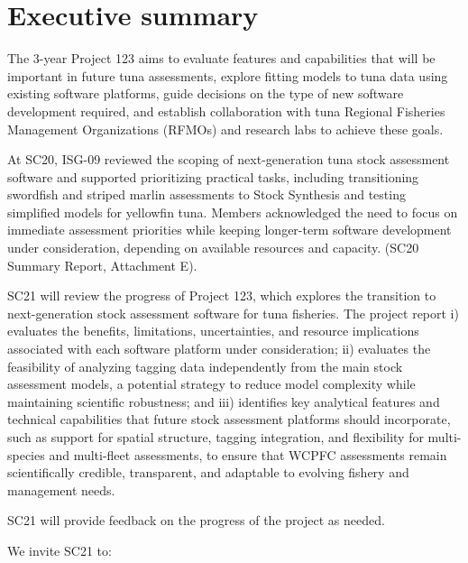 \documentclass{SCreport}
\begin{document}
\wcpfctitlepage

\tableofcontents
\newpage

\section{Executive summary}

The 3-year Project 123 aims to evaluate features and capabilities that will be
important in future tuna assessments, explore fitting models to tuna data using
existing software platforms, guide decisions on the type of new software
development required, and establish collaboration with tuna Regional Fisheries
Management Organizations (RFMOs) and research labs to achieve these goals.

At SC20, ISG-09 reviewed the scoping of next-generation tuna stock assessment
software and supported prioritizing practical tasks, including transitioning
swordfish and striped marlin assessments to Stock Synthesis and testing
simplified models for yellowfin tuna. Members acknowledged the need to focus on
immediate assessment priorities while keeping longer-term software development
under consideration, depending on available resources and capacity. (SC20
Summary Report, Attachment E).

SC21 will review the progress of Project 123, which explores the transition to
next-generation stock assessment software for tuna fisheries. The project report
i) evaluates the benefits, limitations, uncertainties, and resource implications
associated with each software platform under consideration; ii) evaluates the
feasibility of analyzing tagging data independently from the main stock
assessment models, a potential strategy to reduce model complexity while
maintaining scientific robustness; and iii) identifies key analytical features
and technical capabilities that future stock assessment platforms should
incorporate, such as support for spatial structure, tagging integration, and
flexibility for multi-species and multi-fleet assessments, to ensure that WCPFC
assessments remain scientifically credible, transparent, and adaptable to
evolving fishery and management needs.

SC21 will provide feedback on the progress of the project as needed.

\vspace{4ex}

We invite SC21 to:
\end{document}
